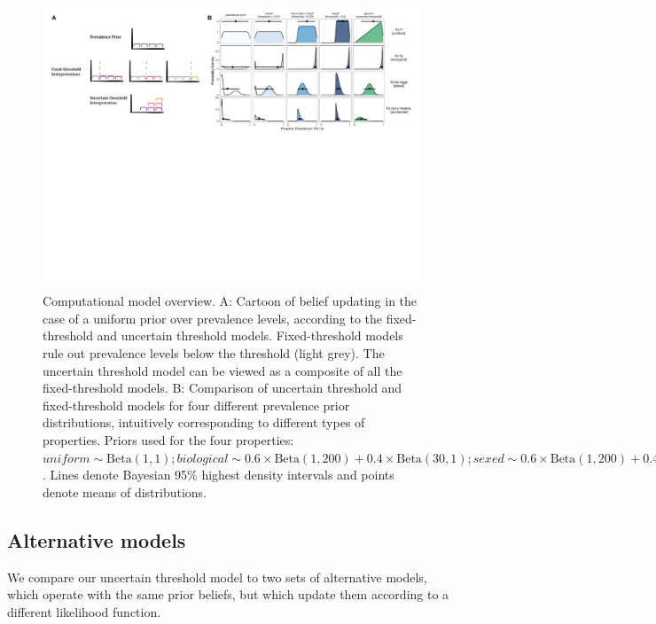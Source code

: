 \documentclass[floatsintext,doc]{apa6}
\begin{document}
\begin{figure}
\centering
\includegraphics{figs/cartoon-model-sims}
\caption{\label{fig:modelSimulations}
Computational model overview.
A: Cartoon of belief updating in the case of a uniform prior over prevalence levels, according to the fixed-threshold and uncertain threshold models. Fixed-threshold models rule out prevalence levels below the threshold (light grey). The uncertain threshold model can be viewed as a composite of all the fixed-threshold models.
B: Comparison of uncertain threshold and fixed-threshold models for four different prevalence prior distributions, intuitively corresponding to different types of properties. Priors used for the four properties: $\textit{uniform} \sim \text{Beta}(1, 1); \textit{biological} \sim 0.6 \times \text{Beta}(1, 200) + 0.4 \times \text{Beta}(30, 1); \textit{sexed} \sim 0.6 \times \text{Beta}(1, 200) + 0.4 \times \text{Beta}(10, 10); \textit{accidental} \sim 0.6 \times \text{Beta}(1, 200) + 0.4 \times \text{Beta}(2, 10)$. Lines denote Bayesian 95\% highest density intervals and points denote means of distributions.
}
\end{figure}


\hypertarget{alternative-semantic-models}{%
\subsection{Alternative models}\label{alternative-semantic-models}}

We compare our uncertain threshold model to two sets of alternative models, which operate with the same prior beliefs, but which update them according to a different likelihood function. 
\end{document}
